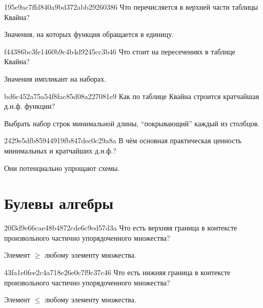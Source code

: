 \begin{note}{195e9ac7ffd840a9bd372abb29260386}
    Что перечисляется в верхней части таблицы Квайна?

    \begin{cloze}{1}
        Значения, на которых функция обращается в единицу.
    \end{cloze}
\end{note}

\begin{note}{f44386bc3fe1460b9c4b4d9245cc3b46}
    Что стоит на пересечениях в таблице Квайна?

    \begin{cloze}{1}
        Значения импликант на наборах.
    \end{cloze}
\end{note}

\begin{note}{bd6c452a75a54f8fac85d08a227081e9}
    Как по таблице Квайна строится кратчайшая д.н.ф. функции?

    \begin{cloze}{1}
        Выбрать набор строк минимальной длины, ``покрывающий'' каждый из столбцов.
    \end{cloze}
\end{note}

\begin{note}{2429e5dfb85944919fb847dec0c29a8a}
    В чём основная практическая ценность минимальных и кратчайших д.н.ф.?

    \begin{cloze}{1}
        Они потенциально упрощают схемы.
   \end{cloze}
\end{note}

\section{Булевы алгебры}
\begin{note}{20f3d9e66cae48b4872cde6c9ed57d3a}
    Что есть верхняя граница в контексте произвольного частично упорядоченного множества?

    \begin{cloze}{1}
        Элемент \({ \geqslant }\) любому элементу множества.
    \end{cloze}
\end{note}

\begin{note}{43fa1e0fee2c4a718e26e0c7f9c37c46}
    Что есть нижняя граница в контексте произвольного частично упорядоченного множества?

    \begin{cloze}{1}
        Элемент \({ \leqslant }\) любому элементу множества.
    \end{cloze}
\end{note}


